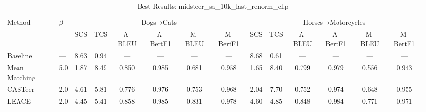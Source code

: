 \begin{table}[htbp]
\centering
\caption{Best Results: midsteer\_sa\_10k\_last\_renorm\_clip}
\label{tab:best_midsteersa10klastrenormclip}
\begin{tabular}{l|l|cccccc|cccccc|}
\hline
Method & $\beta$ & \multicolumn{6}{c|}{Dogs→Cats} & \multicolumn{6}{c|}{Horses→Motorcycles} \\
 &  & SCS & TCS & A-BLEU & A-BertF1 & M-BLEU & M-BertF1 & SCS & TCS & A-BLEU & A-BertF1 & M-BLEU & M-BertF1 \\
\hline
Baseline & — & 8.63 & 0.94 & — & — & — & — & 8.68 & 0.61 & — & — & — & — \\
Mean Matching & 5.0 & 1.87 & 8.49 & 0.850 & 0.985 & 0.681 & 0.958 & 1.65 & 8.40 & 0.799 & 0.979 & 0.556 & 0.943 \\
CASTeer & 2.0 & 4.61 & 5.81 & 0.776 & 0.976 & 0.753 & 0.968 & 2.04 & 7.70 & 0.752 & 0.974 & 0.648 & 0.955 \\
LEACE & 2.0 & 4.45 & 5.41 & 0.858 & 0.985 & 0.831 & 0.978 & 4.60 & 4.85 & 0.848 & 0.984 & 0.771 & 0.971 \\
\hline
\end{tabular}
\end{table}
